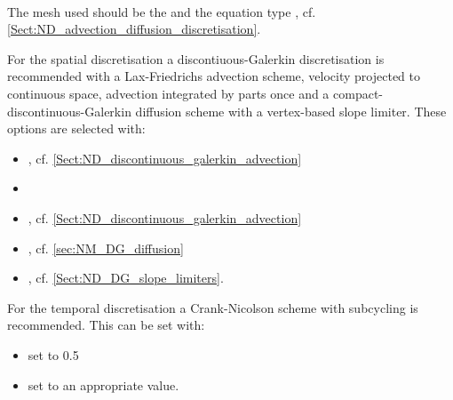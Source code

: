 {\bf \PoDGPt} \\

The mesh used should be the  and the equation type , cf. \ref{Sect:ND_advection_diffusion_discretisation}. 

For the spatial discretisation a discontiuous-Galerkin discretisation
is recommended with a Lax-Friedrichs advection scheme, velocity
projected to continuous space, advection integrated by parts once and
a compact-discontinuous-Galerkin diffusion scheme with a vertex-based
slope limiter. These options are selected with:
\begin{itemize}
\item{, cf. \ref{Sect:ND_discontinuous_galerkin_advection}}
\item{}
\item{, cf. \ref{Sect:ND_discontinuous_galerkin_advection}}
\item{, cf. \ref{sec:NM_DG_diffusion}}
\item{, cf. \ref{Sect:ND_DG_slope_limiters}.}
\end{itemize}

For the temporal discretisation a Crank-Nicolson scheme with subcycling is recommended. This can be set with:
\begin{itemize}
\item{ set to 0.5}
\item{ set to an appropriate value.}
\end{itemize}


